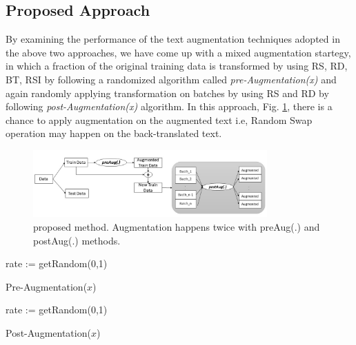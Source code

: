 \documentclass{article}
\begin{document}
\subsection{Proposed Approach}
By examining the performance of the text augmentation techniques adopted in the above two approaches, we have come up with a mixed augmentation startegy, in which a fraction of the original training data is transformed by using RS, RD, BT, RSI by following a randomized algorithm called \textit{pre-Augmentation(x)} and again randomly applying transformation on batches by using RS and RD by following \textit{post-Augmentation(x)} algorithm. In this approach, Fig. \ref{fig:proposedapproach}, there is a chance to apply augmentation on the augmented text i.e, Random Swap operation may happen on the back-translated text.

\begin{figure}[h!]
\centering
  \includegraphics[width=0.8\textwidth]{proposedmethod.jpg}
  \caption{proposed method. Augmentation happens twice with preAug(.) and postAug(.) methods.}
  \label{fig:proposedapproach}
\end{figure}

\begin{algorithm}[H]
\SetAlgoLined
{}
rate := getRandom(0,1) 
\caption{Pre-Augmentation($x$)}
\end{algorithm}


\begin{algorithm}[H]
\SetAlgoLined
{}
rate := getRandom(0,1)    
\caption{Post-Augmentation($x$)}
\end{algorithm}
\end{document}
